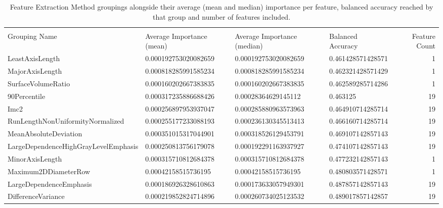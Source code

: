 {\tiny
  \begin{xltabular}[H]{\textwidth}{X l l l r}
    \caption{Feature Extraction Method groupings alongside their average (mean and median) importance per feature, balanced accuracy reached by that group and number of features included.}\label{tbl:syn_feature_extraction_method}\endlastfoot\\
    Grouping Name                          & Average Importance (mean) & Average Importance (median) & Balanced Accuracy & Feature Count\\\hline\endhead
    LeastAxisLength                        & \num{0.000192753020082659} & \num{0.000192753020082659} & \num{0.461428571428571} & 1\\
    MajorAxisLength                        & \num{0.000818285991585234} & \num{0.000818285991585234} & \num{0.462321428571429} & 1\\
    SurfaceVolumeRatio                     & \num{0.000160202667383835} & \num{0.000160202667383835} & \num{0.462589285714286} & 1\\
    90Percentile                           & \num{0.000317235886688426} & \num{0.00028364629145112}  & \num{0.463125} & 19\\
    Imc2                                   & \num{0.000256897953937047} & \num{0.000285880963573963} & \num{0.464910714285714} & 19\\
    RunLengthNonUniformityNormalized       & \num{0.000255177233088193} & \num{0.000236130345513413} & \num{0.466160714285714} & 19\\
    MeanAbsoluteDeviation                  & \num{0.000351015317044901} & \num{0.000318526129453791} & \num{0.469107142857143} & 19\\
    LargeDependenceHighGrayLevelEmphasis   & \num{0.000250813756179078} & \num{0.000192291163937927} & \num{0.474107142857143} & 19\\
    MinorAxisLength                        & \num{0.000315710812684378} & \num{0.000315710812684378} & \num{0.477232142857143} & 1\\
    Maximum2DDiameterRow                   & \num{0.00042158515736195}  & \num{0.00042158515736195}  & \num{0.480803571428571} & 1\\
    LargeDependenceEmphasis                & \num{0.000186926328610863} & \num{0.000173633057949301} & \num{0.487857142857143} & 19\\
    DifferenceVariance                     & \num{0.000219852824714896} & \num{0.000260734025123532} & \num{0.489017857142857} & 19\\

\end{xltabular}}

